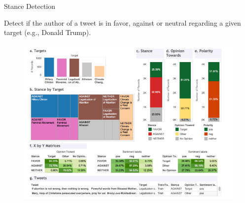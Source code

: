\documentclass[handout]{beamer}
\begin{document}
\begin{frame}{Stance Detection}
\begin{scriptsize}

 Detect if the author of a tweet is in favor, against or neutral regarding a given target (e.g., Donald Trump). 

     \begin{figure}[h]
        	\includegraphics[scale = 0.3]{pics/stance.png}
        \end{figure} 
 
 
\end{scriptsize}

\end{frame}
\end{document}
